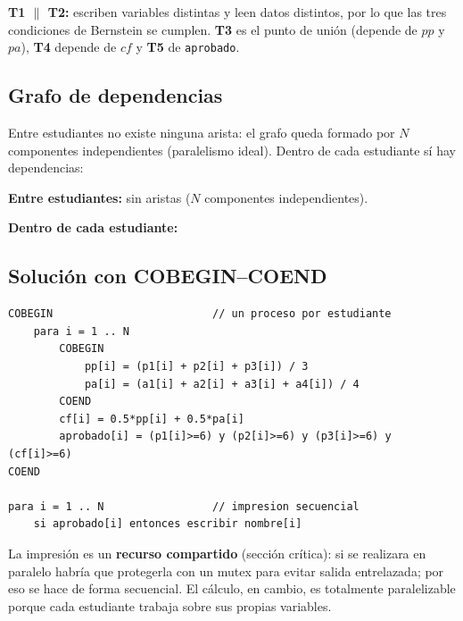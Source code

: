 \textbf{T1 $\parallel$ T2:} escriben variables distintas y leen datos distintos,
por lo que las tres condiciones de Bernstein se cumplen. \textbf{T3} es el
punto de uni\'on (depende de $pp$ y $pa$), \textbf{T4} depende de $cf$ y
\textbf{T5} de \texttt{aprobado}.

\subsection*{Grafo de dependencias}
Entre estudiantes no existe ninguna arista: el grafo queda formado por $N$
componentes independientes (paralelismo ideal). Dentro de cada estudiante s\'i
hay dependencias:

\begin{center}
\textbf{Entre estudiantes:} sin aristas ($N$ componentes independientes).

\vspace{0.4cm}

\vspace{0.6cm}
\textbf{Dentro de cada estudiante:}

\vspace{0.4cm}
\end{center}

\subsection*{Soluci\'on con COBEGIN--COEND}
\begin{lstlisting}
COBEGIN                         // un proceso por estudiante
    para i = 1 .. N
        COBEGIN
            pp[i] = (p1[i] + p2[i] + p3[i]) / 3
            pa[i] = (a1[i] + a2[i] + a3[i] + a4[i]) / 4
        COEND
        cf[i] = 0.5*pp[i] + 0.5*pa[i]
        aprobado[i] = (p1[i]>=6) y (p2[i]>=6) y (p3[i]>=6) y (cf[i]>=6)
COEND

para i = 1 .. N                 // impresion secuencial
    si aprobado[i] entonces escribir nombre[i]
\end{lstlisting}

\noindent
La impresi\'on es un \textbf{recurso compartido} (secci\'on cr\'itica): si se
realizara en paralelo habr\'ia que protegerla con un mutex para evitar salida
entrelazada; por eso se hace de forma secuencial. El c\'alculo, en cambio, es
totalmente paralelizable porque cada estudiante trabaja sobre sus propias
variables.
